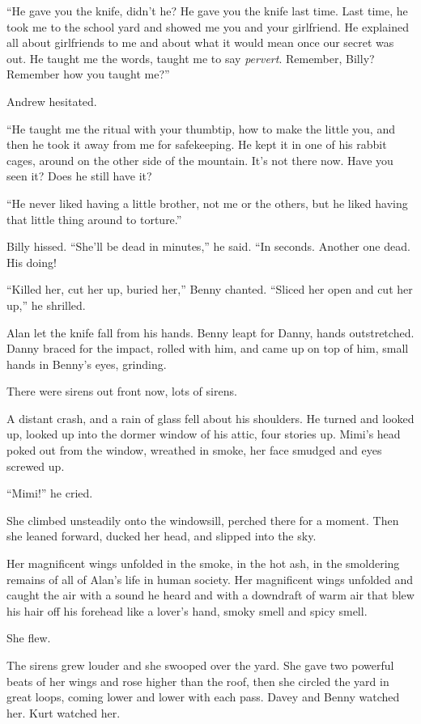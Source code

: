 ``He gave you the knife, didn't he?  He gave you the knife last time. 
Last time, he took me to the school yard and showed me you and your
girlfriend.  He explained all about girlfriends to me and about what
it would mean once our secret was out.  He taught me the words, taught
me to say \textit{pervert}.  Remember, Billy?  Remember how you taught
me?''

Andrew hesitated. 

``He taught me the ritual with your thumbtip, how to make the little
you, and then he took it away from me for safekeeping.  He kept it in
one of his rabbit cages, around on the other side of the mountain. 
It's not there now.  Have you seen it?  Does he still have it?

``He never liked having a little brother, not me or the others, but he
liked having that little thing around to torture.''

Billy hissed.  ``She'll be dead in minutes,'' he said.  ``In seconds. 
Another one dead.  His doing!

``Killed her, cut her up, buried her,'' Benny chanted.  ``Sliced her
open and cut her up,'' he shrilled.

Alan let the knife fall from his hands.  Benny leapt for Danny, hands
outstretched.  Danny braced for the impact, rolled with him, and came
up on top of him, small hands in Benny's eyes, grinding.

There were sirens out front now, lots of sirens.

A distant crash, and a rain of glass fell about his shoulders.  He
turned and looked up, looked up into the dormer window of his attic,
four stories up.  Mimi's head poked out from the window, wreathed in
smoke, her face smudged and eyes screwed up.

``Mimi!'' he cried.

She climbed unsteadily onto the windowsill, perched there for a
moment.  Then she leaned forward, ducked her head, and slipped into
the sky.

Her magnificent wings unfolded in the smoke, in the hot ash, in the
smoldering remains of all of Alan's life in human society.  Her
magnificent wings unfolded and caught the air with a sound he heard
and with a downdraft of warm air that blew his hair off his forehead
like a lover's hand, smoky smell and spicy smell. 

She flew.

The sirens grew louder and she swooped over the yard.  She gave two
powerful beats of her wings and rose higher than the roof, then she
circled the yard in great loops, coming lower and lower with each
pass.  Davey and Benny watched her.  Kurt watched her. 

